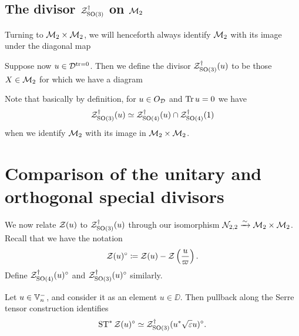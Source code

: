 \subsection{The divisor $\mathcal Z^{\dagger}_{\operatorname{SO}(3)}$ on $\mathcal M_2$}
Turning to $\mathcal M_2 \times \mathcal M_2$, we will henceforth always identify $\mathcal M_2$
with its image under the diagonal map
\begin{center}
\end{center}

\begin{definition}
  Suppose now $u \in \mathcal D^{\operatorname{tr} = 0}$.
  Then we define the divisor $\mathcal Z^{\dagger}_{\operatorname{SO}(3)}(u)$ to be those $X \in \mathcal M_2$
  for which we have a diagram
  \begin{center}
  \end{center}
  Note that basically by definition, for $u \in O_\mathcal D$ and $\operatorname{Tr} u = 0$ we have
  \[ \mathcal Z^{\dagger}_{\operatorname{SO}(3)}(u) \simeq \mathcal Z^{\dagger}_{\operatorname{SO}(4)}(u) \cap \mathcal Z^{\dagger}_{\operatorname{SO}(4)}(1) \]
  when we identify $\mathcal M_2$ with its image in $\mathcal M_2 \times \mathcal M_2$.
\end{definition}

\section{Comparison of the unitary and orthogonal special divisors}
We now relate $\mathcal Z(u)$ to $\mathcal Z^{\dagger}_{\operatorname{SO}(3)}(u)$ through our
isomorphism $\mathcal N_{2,2} \xrightarrow{\sim} \mathcal M_2 \times \mathcal M_2$.
Recall that we have the notation
\[ \mathcal Z(u)^\circ \coloneqq \mathcal Z(u) - \mathcal Z\left( \frac{u}{\varpi} \right). \]
Define $\mathcal Z^{\dagger}_{\operatorname{SO}(4)}(u)^\circ$ and $\mathcal Z^{\dagger}_{\operatorname{SO}(3)}(u)^\circ$ similarly.

\begin{conjecture}
  Let $u \in \mathbb V_n^-$, and consider it as an element $u \in \DD$.
  Then pullback along the Serre tensor construction identifies
  \[ \operatorname{ST}^\ast \mathcal Z(u)^\circ \simeq \mathcal Z^{\dagger}_{\operatorname{SO}(3)}(u^\ast \sqrt{\varepsilon} u)^\circ. \]
\end{conjecture}

